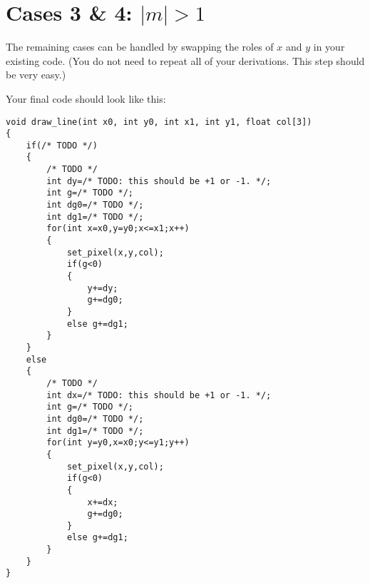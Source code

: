 \documentclass[12pt]{article}
\begin{document}
\section{Cases 3 \& 4: $|m|>1$}

The remaining cases can be handled by swapping the roles of $x$ and $y$ in your
existing code.  (You do not need to repeat all of your derivations.  This step
should be very easy.)

Your final code should look like this:
\begin{lstlisting}
void draw_line(int x0, int y0, int x1, int y1, float col[3])
{
    if(/* TODO */)
    {
        /* TODO */
        int dy=/* TODO: this should be +1 or -1. */;
        int g=/* TODO */;
        int dg0=/* TODO */;
        int dg1=/* TODO */;
        for(int x=x0,y=y0;x<=x1;x++)
        {
            set_pixel(x,y,col);
            if(g<0)
            {
                y+=dy;
                g+=dg0;
            }
            else g+=dg1;
        }
    }
    else
    {
        /* TODO */
        int dx=/* TODO: this should be +1 or -1. */;
        int g=/* TODO */;
        int dg0=/* TODO */;
        int dg1=/* TODO */;
        for(int y=y0,x=x0;y<=y1;y++)
        {
            set_pixel(x,y,col);
            if(g<0)
            {
                x+=dx;
                g+=dg0;
            }
            else g+=dg1;
        }
    }
}
\end{lstlisting}
\end{document}
